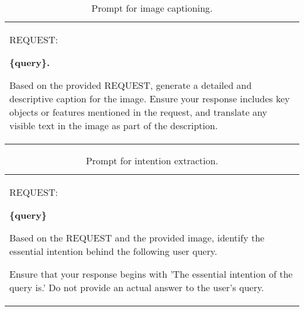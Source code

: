 \begin{table*}[t]\centering
    \begin{minipage}{\textwidth}   
    \centering
        \begin{tcolorbox} 
            \centering
            \normalsize
            \begin{tabular}{p{}}
            {
            REQUEST:
            
            \textbf{\{query\}.}
            
            Based on the provided REQUEST, generate a detailed and descriptive caption for the image. Ensure your response includes key objects or features mentioned in the request, and translate any visible text in the image as part of the description.
            } %
            \end{tabular}
        \end{tcolorbox}
        \caption{Prompt for image captioning.} 
        \label{tab:caption}
        \vspace{10pt}
    \end{minipage}
\end{table*} %

\begin{table*}[t]\centering
    \begin{minipage}{\textwidth}   
    \centering
        \begin{tcolorbox} 
            \centering
            \normalsize
            \begin{tabular}{p{}}
            {
            REQUEST:
            
            \textbf{\{query\}}
            
            Based on the REQUEST and the provided image, identify the essential intention behind the following user query.
            
            Ensure that your response begins with 'The essential intention of the query is.' Do not provide an actual answer to the user's query.
            } %
            \end{tabular}
        \end{tcolorbox}
        \caption{Prompt for intention extraction.} 
        \label{tab:intention}
        \vspace{10pt}
    \end{minipage}
\end{table*} %

